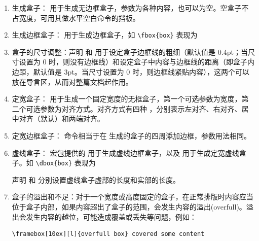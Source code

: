 \begin{enumerate}
\item 生成盒子：\boxforcmd{\\mbox{}} 用于生成无边框盒子，参数为各种内容，也可以为空。空盒子不占宽度，可用其做水平空白命令的挡板。

\item 生成边框盒子：\boxforcmd{\\fbox{}} 用于生成边框盒子，如 \verb|\fbox{box}| 表现为 

\item 盒子的尺寸调整：声明  和  用于设定盒子边框线的粗细（默认值是 0.4pt；当尺寸设置为 0 时，则没有边框线）和设定盒子中内容与边框线的距离（即盒子内边距，默认值是 3pt。当尺寸设置为 0 时，则边框线紧贴内容），这两个可以放在导言区，从而对整篇文档起作用。

\item 定宽盒子：\boxforcmd{\\makebox[][]{}} 用于生成一个固定宽度的无框盒子，第一个可选参数为宽度，第二个可选参数为对齐方式。对齐方式有四种  ，分别表示左对齐、右对齐、居中对齐（默认）和两端对齐。

\item 定宽边框盒子：\boxforcmd{\\framebox} 命令相当于在 \boxforcmd{\\makebox} 生成的盒子的四周添加边框，参数用法相同。

\item 虚线盒子： 宏包提供的 \boxforcmd{\\dbox{}} 用于生成虚线边框盒子，以及 \boxforcmd{\\dashbox} 用于生成定宽虚线盒子。如 \verb|\dbox{box}| 表现为 

声明  和  分别设置虚线盒子虚部的长度和实部的长度。

\item 盒子的溢出和不足：对于一个宽度或高度固定的盒子，在正常排版时内容应当位于盒子内部，如果内容超出了盒子的范围，会发生内容的溢出(overfull)。溢出会发生内容的越位，可能造成覆盖或丢失等问题，例如：

\begin{tcolorbox}[sidebyside]
\begin{lstlisting}
\framebox[10ex][l]{overfull box} covered some content
\end{lstlisting}


\end{tcolorbox}
\end{enumerate}

